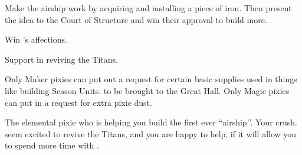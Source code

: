 \documentclass[char]{PP}
\begin{document}
\begin{itemz}
	\item Make the airship work by acquiring and installing a piece of iron. Then present the idea to the Court of Structure and win their approval to build more.
	\item Win \cETitan{}'s affections.
	\item Support \cETitan{} in reviving the Titans.
\end{itemz}

\begin{itemz}[Notes]
	\item Only Maker pixies can put out a request for certain basic supplies used in things like building Season Units. to be brought to the Great Hall. Only Magic pixies can put in a request for extra pixie dust.
\end{itemz}

\begin{contacts}
	\contact{\cEAirship{}} The elemental pixie who is helping you build the first ever ``airship’’.
	\contact{\cETitan{}} Your crush.  \cETitan{\They} seem\cETitan{\verbs} excited to revive the Titans, and you are happy to help, if it will allow you to spend more time with \cETitan{\they}.
\end{contacts}
\end{document}
